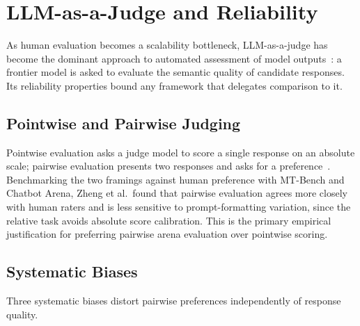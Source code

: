 \section{LLM-as-a-Judge and Reliability}\label{sec:llm-as-a-judge}

As human evaluation becomes a scalability bottleneck, LLM-as-a-judge
has become the dominant approach to automated assessment of model
outputs~\parencite{zheng2023judging}: a frontier model is asked to
evaluate the semantic quality of candidate responses. Its reliability
properties bound any framework that delegates comparison to it.

\subsection*{Pointwise and Pairwise Judging}

Pointwise evaluation asks a judge model to score a single response on
an absolute scale; pairwise evaluation presents two responses and
asks for a preference~\parencite{zheng2023judging}. Benchmarking the
two framings against human preference with MT-Bench and Chatbot
Arena, Zheng et al.\ found that pairwise evaluation agrees more
closely with human raters and is less sensitive to prompt-formatting
variation, since the relative task avoids absolute score calibration.
This is the primary empirical justification for preferring pairwise
arena evaluation over pointwise scoring.

\subsection*{Systematic Biases}

Three systematic biases distort pairwise preferences independently of
response quality.


